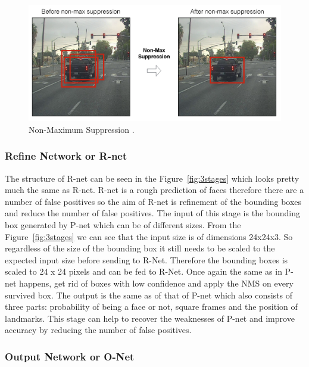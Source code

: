 \begin{figure}[!htb]
    \centering
    \includegraphics[width=1\textwidth]{figures/non-max.png}
    \caption{ Non-Maximum Suppression \cite{boxescar}.}
    \label{fig:non-max}
\end{figure}
\subsubsection{Refine Network or R-net}

The structure of R-net can be seen in the Figure~\ref{fig:3stages} which looks pretty much the same as R-net. R-net is a rough prediction of faces therefore there are a number of false positives so the aim of R-net is refinement of the bounding boxes and reduce the number of false positives.
The input of this stage is the bounding box generated by P-net which can be of different sizes. From the Figure~\ref{fig:3stages} we can see that the input size is of dimensions 24x24x3. So regardless of the size of the bounding box it still needs to be scaled to the expected input size before sending to R-Net. Therefore the bounding boxes is scaled to 24 x 24 pixels and can be fed to R-Net. Once again the same as in P-net happens, get rid of boxes with low confidence and apply the NMS on every survived box. The output is the same as of that of P-net which also consists of three parts: probability of being a face or not, square frames and the position of landmarks. This stage can help to recover the weaknesses of P-net and improve accuracy by reducing the number of false positives. 


\subsubsection{Output Network or O-Net}


